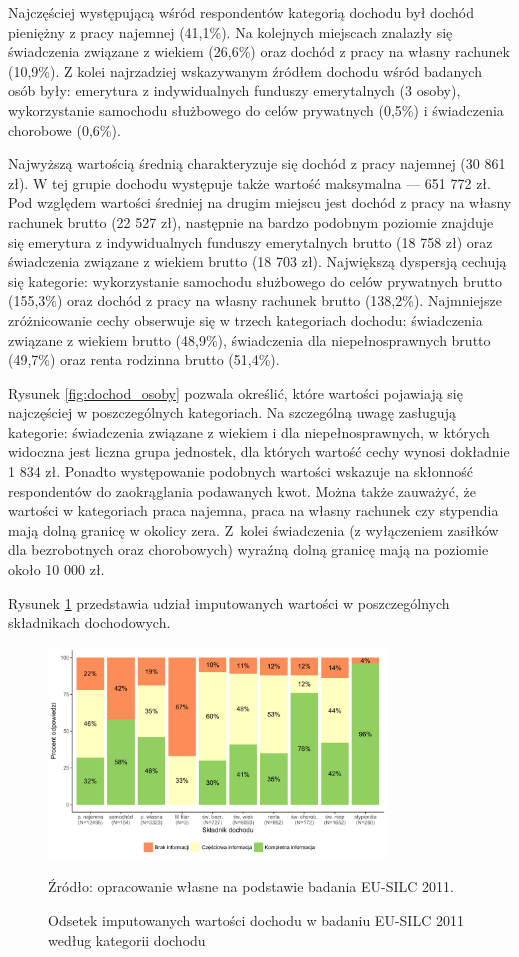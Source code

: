 Najczęściej występującą wśród respondentów kategorią dochodu był dochód pieniężny z pracy najemnej (41,1\%). Na kolejnych miejscach znalazły się świadczenia związane z wiekiem (26,6\%) oraz dochód z pracy na własny rachunek (10,9\%). Z kolei najrzadziej wskazywanym źródłem dochodu wśród badanych osób były: emerytura z indywidualnych funduszy emerytalnych (3 osoby), wykorzystanie samochodu służbowego do celów prywatnych (0,5\%) i świadczenia chorobowe (0,6\%).

Najwyższą wartością średnią charakteryzuje się dochód z pracy najemnej (30 861 zł). W tej grupie dochodu występuje także wartość maksymalna --- 651 772 zł. Pod względem wartości średniej na drugim miejscu jest dochód z pracy na własny rachunek brutto (22 527 zł), następnie na bardzo podobnym poziomie znajduje się emerytura z indywidualnych funduszy emerytalnych brutto (18 758 zł) oraz świadczenia związane z wiekiem brutto (18 703 zł). Największą dyspersją cechują się kategorie: wykorzystanie samochodu służbowego do celów prywatnych brutto (155,3\%) oraz dochód z pracy na własny rachunek brutto (138,2\%). Najmniejsze zróżnicowanie cechy obserwuje się w trzech kategoriach dochodu: świadczenia związane z wiekiem brutto (48,9\%), świadczenia dla niepełnosprawnych brutto (49,7\%) oraz renta rodzinna brutto (51,4\%).

Rysunek \ref{fig:dochod_osoby} pozwala określić, które wartości pojawiają się najczęściej w poszczególnych kategoriach. Na szczególną uwagę zasługują kategorie: świadczenia związane z wiekiem i dla niepełnosprawnych, w których widoczna jest liczna grupa jednostek, dla których wartość cechy wynosi dokładnie 1 834 zł. Ponadto występowanie podobnych wartości wskazuje na skłonność respondentów do zaokrąglania podawanych kwot. Można także zauważyć, że wartości w kategoriach praca najemna, praca na własny rachunek czy stypendia mają dolną granicę w okolicy zera. Z~kolei świadczenia (z wyłączeniem zasiłków dla bezrobotnych oraz chorobowych) wyraźną dolną granicę mają na poziomie około 10 000 zł.

Rysunek \ref{fig:dochod_osoby_imp} przedstawia udział imputowanych wartości w poszczególnych składnikach dochodowych.

\begin{figure}[ht]
\centering
\includegraphics[width=0.8\textwidth]{04_wykresy/dochod_osoby_imputacja-1.pdf}
\caption{Odsetek imputowanych wartości dochodu w badaniu EU-SILC 2011 według kategorii dochodu}
\small{Źródło: opracowanie własne na podstawie badania EU-SILC 2011.}
\label{fig:dochod_osoby_imp}
\end{figure}


